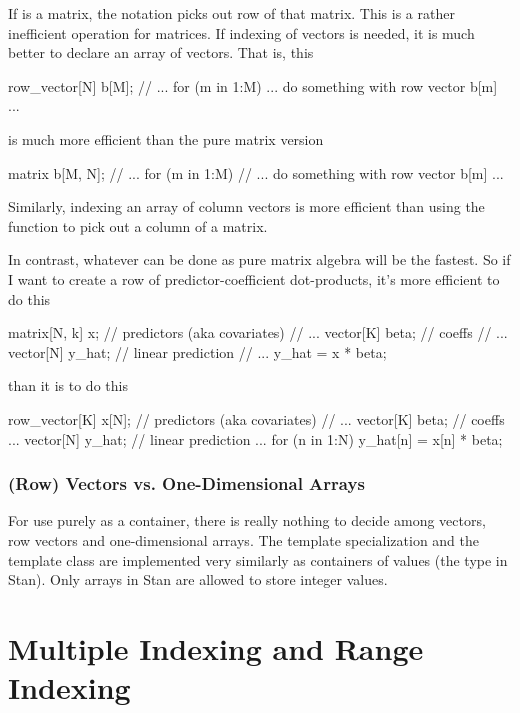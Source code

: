If  is a matrix, the notation  picks out row
 of that matrix.  This is a rather inefficient operation for
matrices.  If indexing of vectors is needed, it is much better to
declare an array of vectors.  That is, this
%
\begin{stancode}
row_vector[N] b[M];
// ...
for (m in 1:M)
   ... do something with row vector b[m] ...
\end{stancode}
%
is much more efficient than the pure matrix version
%
\begin{stancode}
matrix b[M, N];
// ...
for (m in 1:M)
   // ... do something with row vector b[m] ...
\end{stancode}
%
Similarly, indexing an array of column vectors is more efficient than
using the  function to pick out a column of a matrix.

In contrast, whatever can be done as pure matrix algebra will be the
fastest.  So if I want to create a row of predictor-coefficient
dot-products, it's more efficient to do this
%
\begin{stancode}
matrix[N, k] x;    // predictors (aka covariates)
// ...
vector[K] beta;   // coeffs
// ...
vector[N] y_hat;  // linear prediction
// ...
y_hat = x * beta;
\end{stancode}
%
than it is to do this
%
\begin{stancode}
row_vector[K] x[N];    // predictors (aka covariates)
// ...
vector[K] beta;   // coeffs
...
vector[N] y_hat;  // linear prediction
...
for (n in 1:N)
  y_hat[n] = x[n] * beta;
\end{stancode}

\subsection{(Row) Vectors vs. One-Dimensional Arrays}

For use purely as a container, there is really nothing to decide among
vectors, row vectors and one-dimensional arrays.  The
 template specialization and the
 template class are implemented very similarly as
containers of  values (the type  in Stan).
Only arrays in Stan are allowed to store integer values.



\chapter{Multiple Indexing and Range Indexing}\label{multi-indexing.chapter}

